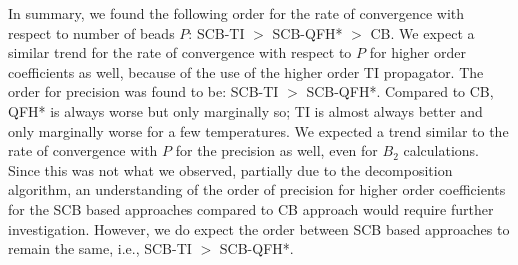 In summary, we found the following order for the rate of convergence with respect to number of beads $P$: SCB-TI $>$ SCB-QFH* $>$ CB. We expect a similar trend for the rate of convergence with respect to $P$ for higher order coefficients as well, because of the use of the higher order TI propagator. The order for precision was found to be: SCB-TI $>$ SCB-QFH*. Compared to CB, QFH* is always worse but only marginally so; TI is almost always better and only marginally worse for a few temperatures. We expected a trend similar to the rate of convergence with $P$ for the precision as well, even for $B_2$ calculations. Since this was not what we observed, partially due to the decomposition algorithm, an understanding of the order of precision for higher order coefficients for the SCB based approaches compared to CB approach would require further investigation. However, we do expect the order between SCB based approaches to remain the same, i.e., SCB-TI $>$ SCB-QFH*.

